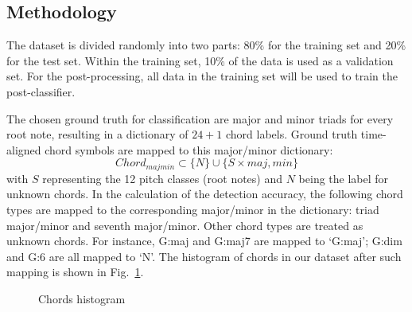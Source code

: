 \documentclass{article}
\begin{document}
\subsection{Methodology}

The dataset is divided randomly into two parts: 80\% for the training set and 20\% for the test set. Within the training set, 10\% of the data is used as a validation set. For the post-processing, all data in the training set will be used to train the post-classifier.

The chosen ground truth for classification are major and minor triads for every root note, resulting in a dictionary of $24+1$ chord labels.
Ground truth time-aligned chord symbols are mapped to this major/minor dictionary:
\begin{equation}
Chord_{majmin} \subset \{N\} \cup \{S \times {maj,min}\}
\end{equation}
with $S$ representing the 12 pitch classes (root notes) and $N$ being the label for unknown chords. In the calculation of the detection accuracy, the following chord types are mapped to the corresponding major/minor in the dictionary: triad major/minor and seventh major/minor. Other chord types are treated as unknown chords. For instance, G:maj and G:maj7 are mapped to `G:maj'; G:dim and G:6 are all mapped to `N'. The histogram of chords in our dataset after such mapping is shown in Fig.~\ref{fig:distrib}. 
\begin{figure}
 \centerline{}
 \caption{Chords histogram}
 \label{fig:distrib}
\end{figure}
\end{document}
